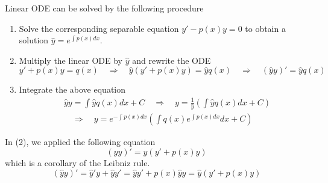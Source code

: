 \begin{theorem}[]\label{th.linear_ODE}
    Linear ODE can be solved by the following procedure
    \begin{enumerate}
        \item Solve the corresponding separable equation $y' - p(x)y = 0$ to obtain a solution $\hat{y} = e^{\int p(x)dx}$.
        \item Multiply the linear ODE by $\hat{y}$ and rewrite the ODE
        \begin{equation*}
            y' + p(x)y = q(x)
            \quad\Rightarrow\quad 
            \hat{y}(y' + p(x)y) = \hat{y}q(x)
            \quad\Rightarrow\quad 
            (\hat{y}y)' = \hat{y}q(x)
        \end{equation*}
        \item Integrate the above equation 
        \begin{equation*}
            \begin{split}
                &\hat{y}y = \int \hat{y}q(x) dx + C
                \quad\Rightarrow\quad 
                y = \frac{1}{\hat{y}}\left(\int \hat{y}q(x) dx +  C\right)
                \\
                &
                \quad \Rightarrow \quad
                y = e^{-\int p(x)dx}\left(\int q(x)e^{\int p(x)dx} dx+C\right)
            \end{split}
        \end{equation*}
    \end{enumerate}
\end{theorem}
\begin{remark}[]
    In (2), we applied the following equation
    \begin{equation*}
        (\hat{y}y)' = \hat{y}(y' + p(x)y) 
    \end{equation*} 
    which is a corollary of the Leibniz rule.
    \begin{equation*}
        (\hat{y}y)' = \hat{y}'y + \hat{y}y' = \hat{y}y' + p(x) \hat{y} y = \hat{y}(y' + p(x)y) 
    \end{equation*}
\end{remark}

